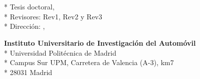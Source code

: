 \cleardoublepage
\begin{fullwidth}
~\vfill
\thispagestyle{empty}
\setlength{\parindent}{0pt}
\setlength{\parskip}{\baselineskip}
\theauthor

\par{
	\textit{\thetitle}\\*
	Tesis doctoral, \thedate\\*
	Revisores: Rev1, Rev2 y Rev3\\*
	Dirección: \thanklessadvisorone, \thanklessadvisortwo
	}

\par{
	\textbf{Instituto Universitario de Investigación del Automóvil}\\*
	Universidad Politécnica de Madrid\\*
	Campus Sur UPM, Carretera de Valencia (A-3), km7\\*
	28031 Madrid
}

\par{
	\doclicenseThis
}

\end{fullwidth}